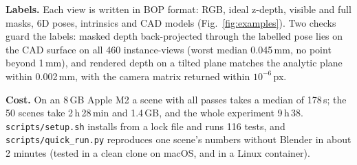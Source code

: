 \documentclass[10pt,a4paper]{article}
\newcommand{\para}[1]{\textbf{#1}\enspace}
\begin{document}
\para{Labels.} Each view is written in BOP format: RGB, ideal z-depth, visible and full masks, 6D poses, intrinsics and CAD models (Fig.~\ref{fig:examples}). Two checks guard the labels: masked depth back-projected through the labelled pose lies on the CAD surface on all 460 instance-views (worst median 0.045\,mm, no point beyond 1\,mm), and rendered depth on a tilted plane matches the analytic plane within 0.002\,mm, with the camera matrix returned within $10^{-6}$\,px.

\para{Cost.} On an 8\,GB Apple M2 a scene with all passes takes a median of 178\,s; the 50 scenes take 2\,h\,28\,min and 1.4\,GB, and the whole experiment 9\,h\,38. \texttt{scripts/setup.sh} installs from a lock file and runs 116 tests, and \texttt{scripts/quick\_run.py} reproduces one scene's numbers without Blender in about 2 minutes (tested in a clean clone on macOS, and in a Linux container).
\end{document}
